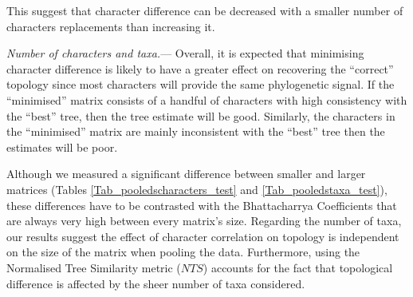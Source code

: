 \documentclass[12pt,letterpaper]{article}
\renewcommand{\subsubsection}[1]{%
\vspace{2ex}
\noindent
\textit{#1.}---}
\begin{document}
This suggest that character difference can be decreased with a smaller number of characters replacements than increasing it.

\subsubsection{Number of characters and taxa}
Overall, it is expected that minimising character difference %
 is likely to have a greater effect on recovering the ``correct'' topology since most characters will provide the same phylogenetic signal.
If the ``minimised'' matrix consists of a handful of characters with high consistency with the ``best'' tree, then the tree estimate will be good.
Similarly, the characters in the ``minimised'' matrix are mainly inconsistent with the ``best'' tree then the estimates will be poor.

Although we measured a significant difference between smaller and larger matrices (Tables \ref{Tab_pooledscharacters_test} and \ref{Tab_pooledstaxa_test}), %
these differences have to be contrasted with the Bhattacharrya Coefficients that are always very high between every matrix's size.
Regarding the number of taxa, our results suggest the effect of character correlation on topology is independent on the size of the matrix when pooling the data.
Furthermore, using the Normalised Tree Similarity metric ($NTS$) accounts for the fact that topological difference is affected by the sheer number of taxa considered.%
\end{document}
